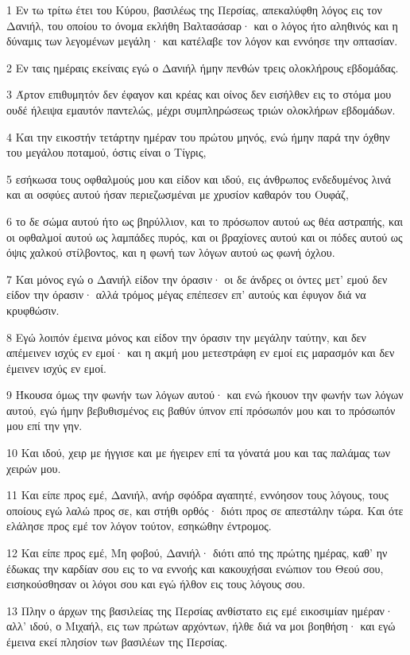 \par 1 Εν τω τρίτω έτει του Κύρου, βασιλέως της Περσίας, απεκαλύφθη λόγος εις τον Δανιήλ, του οποίου το όνομα εκλήθη Βαλτασάσαρ· και ο λόγος ήτο αληθινός και η δύναμις των λεγομένων μεγάλη· και κατέλαβε τον λόγον και εννόησε την οπτασίαν.
\par 2 Εν ταις ημέραις εκείναις εγώ ο Δανιήλ ήμην πενθών τρεις ολοκλήρους εβδομάδας.
\par 3 Άρτον επιθυμητόν δεν έφαγον και κρέας και οίνος δεν εισήλθεν εις το στόμα μου ουδέ ήλειψα εμαυτόν παντελώς, μέχρι συμπληρώσεως τριών ολοκλήρων εβδομάδων.
\par 4 Και την εικοστήν τετάρτην ημέραν του πρώτου μηνός, ενώ ήμην παρά την όχθην του μεγάλου ποταμού, όστις είναι ο Τίγρις,
\par 5 εσήκωσα τους οφθαλμούς μου και είδον και ιδού, εις άνθρωπος ενδεδυμένος λινά και αι οσφύες αυτού ήσαν περιεζωσμέναι με χρυσίον καθαρόν του Ουφάζ,
\par 6 το δε σώμα αυτού ήτο ως βηρύλλιον, και το πρόσωπον αυτού ως θέα αστραπής, και οι οφθαλμοί αυτού ως λαμπάδες πυρός, και οι βραχίονες αυτού και οι πόδες αυτού ως όψις χαλκού στίλβοντος, και η φωνή των λόγων αυτού ως φωνή όχλου.
\par 7 Και μόνος εγώ ο Δανιήλ είδον την όρασιν· οι δε άνδρες οι όντες μετ' εμού δεν είδον την όρασιν· αλλά τρόμος μέγας επέπεσεν επ' αυτούς και έφυγον διά να κρυφθώσιν.
\par 8 Εγώ λοιπόν έμεινα μόνος και είδον την όρασιν την μεγάλην ταύτην, και δεν απέμεινεν ισχύς εν εμοί· και η ακμή μου μετεστράφη εν εμοί εις μαρασμόν και δεν έμεινεν ισχύς εν εμοί.
\par 9 Ήκουσα όμως την φωνήν των λόγων αυτού· και ενώ ήκουον την φωνήν των λόγων αυτού, εγώ ήμην βεβυθισμένος εις βαθύν ύπνον επί πρόσωπόν μου και το πρόσωπόν μου επί την γην.
\par 10 Και ιδού, χειρ με ήγγισε και με ήγειρεν επί τα γόνατά μου και τας παλάμας των χειρών μου.
\par 11 Και είπε προς εμέ, Δανιήλ, ανήρ σφόδρα αγαπητέ, εννόησον τους λόγους, τους οποίους εγώ λαλώ προς σε, και στήθι ορθός· διότι προς σε απεστάλην τώρα. Και ότε ελάλησε προς εμέ τον λόγον τούτον, εσηκώθην έντρομος.
\par 12 Και είπε προς εμέ, Μη φοβού, Δανιήλ· διότι από της πρώτης ημέρας, καθ' ην έδωκας την καρδίαν σου εις το να εννοής και κακουχήσαι ενώπιον του Θεού σου, εισηκούσθησαν οι λόγοι σου και εγώ ήλθον εις τους λόγους σου.
\par 13 Πλην ο άρχων της βασιλείας της Περσίας ανθίστατο εις εμέ εικοσιμίαν ημέραν· αλλ' ιδού, ο Μιχαήλ, εις των πρώτων αρχόντων, ήλθε διά να μοι βοηθήση· και εγώ έμεινα εκεί πλησίον των βασιλέων της Περσίας.
